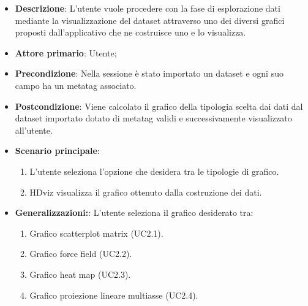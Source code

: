 \begin{itemize}
    \item \textbf{Descrizione}: L’utente vuole procedere con la fase di esplorazione
                                dati mediante la visualizzazione del dataset
                                attraverso uno dei diversi grafici proposti dall’applicativo
                                che ne costruisce uno e lo visualizza.
	
    \item \textbf{Attore primario}: Utente;
    
    \item \textbf{Precondizione}:   Nella sessione è stato importato un dataset e ogni 
                                    suo campo ha un metatag associato.

    \item \textbf{Postcondizione}:  Viene calcolato il grafico della tipologia scelta dai dati 
									dal dataset importato dotato di metatag validi e successivamente 
									visualizzato all'utente.

	\item \textbf{Scenario principale}:
		\begin{enumerate}
			\item L'utente seleziona l'opzione che desidera tra le tipologie di grafico.
			\item HDviz visualizza il grafico ottenuto dalla costruzione dei dati.
        \end{enumerate}

    \item \textbf{Generalizzazioni:}:  L'utente seleziona il grafico desiderato tra:

    \begin{enumerate}
        
        \item Grafico scatterplot matrix (UC2.1).
        \item Grafico force field (UC2.2).
        \item Grafico heat map (UC2.3).
        \item Grafico proiezione lineare multiasse (UC2.4).
        
	\end{enumerate}

\end{itemize}

